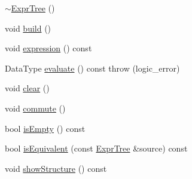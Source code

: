 \begin{DoxyCompactItemize}
\hyperlink{class_expr_tree_a8976e9af7e1209b9db475b863ab9f31d}{$\sim$\+Expr\+Tree} ()
\item 
void \hyperlink{class_expr_tree_a283a61049eb163f6f370d562cc92c824}{build} ()
\item 
void \hyperlink{class_expr_tree_ac367645dc4ccaf488e121cd5a0a8c07d}{expression} () const 
\item 
Data\+Type \hyperlink{class_expr_tree_ad1579e64d55cdfcd500a634ef69ed792}{evaluate} () const   throw (logic\+\_\+error)
\item 
void \hyperlink{class_expr_tree_a87d6593a3ad6199b5521f6d1e3ba851f}{clear} ()
\item 
void \hyperlink{class_expr_tree_a8bfcf0da6dfd93f4228a35cded704fb4}{commute} ()
\item 
bool \hyperlink{class_expr_tree_a3b534db1ad9bf8fefadb20bd1161c96b}{is\+Empty} () const 
\item 
bool \hyperlink{class_expr_tree_ae64a4e3b5008fa2f533fd7461ead2485}{is\+Equivalent} (const \hyperlink{class_expr_tree}{Expr\+Tree} \&source) const 
\item 
void \hyperlink{class_expr_tree_a6f4c5e2ae8224fb53fb893231814e6d9}{show\+Structure} () const 
\end{DoxyCompactItemize}
